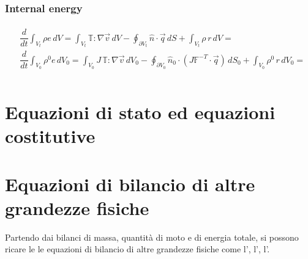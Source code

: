\documentclass[letterpaper,10pt,english]{jupyterBook}
\begin{document}
\subsection{Internal energy}
\label{\detokenize{ch/continuum/balance-reference-integral:internal-energy}}\label{\detokenize{ch/continuum/balance-reference-integral:continuum-governing-equations-reference-integral-internal-energy}}\begin{equation*}
\begin{split}\begin{aligned}
  & \dfrac{d}{d t} \int_{V_t} \rho e \, dV = \int_{V_t} \mathbb{T} : \nabla \vec{v} \, dV - \oint_{\partial V_t} \hat{n} \cdot \vec{q} \, dS + \int_{V_t} \rho \, r \, dV = \\
  & \dfrac{d}{d t} \int_{V_0} \rho^0 e \, dV_0 = \int_{V_0} J \, \mathbb{T} : \nabla \vec{v} \, dV_0 - \oint_{\partial V_0} \hat{n}_0 \cdot \left( J \mathbb{F}^{-T} \cdot \vec{q} \right) \, dS_0 + \int_{V_0} \rho^0 \, r \, dV_0 = \\
\end{aligned}\end{split}
\end{equation*}
\sphinxstepscope


\chapter{Equazioni di stato ed equazioni costitutive}
\label{\detokenize{ch/continuum/constitutive-equations:equazioni-di-stato-ed-equazioni-costitutive}}\label{\detokenize{ch/continuum/constitutive-equations:continuum-constitutive-equations}}\label{\detokenize{ch/continuum/constitutive-equations::doc}}
\sphinxstepscope


\chapter{Equazioni di bilancio di altre grandezze fisiche}
\label{\detokenize{ch/continuum/derived-balances:equazioni-di-bilancio-di-altre-grandezze-fisiche}}\label{\detokenize{ch/continuum/derived-balances:continuum-derived-balances}}\label{\detokenize{ch/continuum/derived-balances::doc}}


\sphinxAtStartPar
Partendo dai bilanci di massa, quantità di moto e di energia totale, si possono ricare le le equazioni di bilancio di altre grandezze fisiche come l’, l’, l’.
\end{document}

